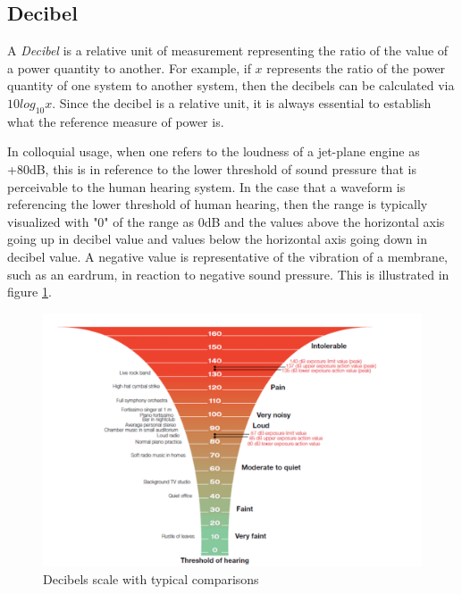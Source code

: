 \documentclass[a4paper,12pt]{report}
\begin{document}
\subsection{Decibel}
\label{subsec:decibel}
A \emph{Decibel} is a relative unit of measurement representing the ratio of the value of a power quantity to another. For example, if $x$ represents the ratio of the power quantity of one system to another system, then the decibels can be calculated via $10 log_10 x$. Since the decibel is a relative unit, it is always essential to establish what the reference measure of power is. 

In colloquial usage, when one refers to the loudness of a jet-plane engine as +80dB, this is in reference to the lower threshold of sound pressure that is perceivable to the human hearing system. In the case that a waveform is referencing the lower threshold of human hearing, then the range is typically visualized with "0" of the range as 0dB and the values above the horizontal axis going up in decibel value and values below the horizontal axis going down in decibel value. A negative value is representative of the vibration of a membrane, such as an eardrum, in reaction to negative sound pressure. This is illustrated in figure \ref{fig:decibelsscale}.

\begin{figure}[h]
    \centering
    \includegraphics[width=36em]{DecibelsScale.png}
    \caption{Decibels scale with typical comparisons}
    \label{fig:decibelsscale}
\end{figure}
\end{document}
